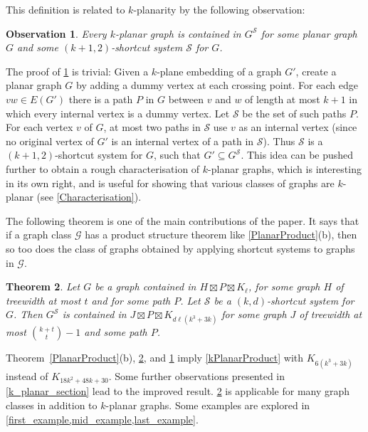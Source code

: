 \documentclass{patmorin}
\theoremstyle{plain}
\newtheorem{thm}{Theorem}
\newtheorem{obs}[thm]{Observation}
\theoremstyle{definition}
\newcommand{\note}[2]{\noindent{\color{red}[#1:~#2]}}
\newcommand{\referee}[2]{\noindent\textcolor{blue}{\framebox{\begin{minipage}{\textwidth} Ref \#{#1}: #2\end{minipage}}}}
\renewcommand{\SS}{\mathcal{S}}
\begin{document}
This definition is related to $k$-planarity by the following observation:

\begin{obs}
\label{AddDummy}
Every $k$-planar graph is contained in $G^\SS$ for some planar graph $G$ and some $(k+1,2)$-shortcut system $\SS$ for $G$.
\end{obs}

The proof of \cref{AddDummy} is trivial: Given a $k$-plane embedding of a graph $G'$, create a planar graph $G$ by adding a dummy vertex at each crossing point. For each edge $vw\in E(G')$ there is a path $P$ in $G$ between $v$ and $w$ of length at most $k+1$ in which every internal vertex is a dummy vertex. Let $\SS$ be the set of such paths $P$. For each vertex $v$ of $G$, at most two paths in $\SS$ use $v$ as an internal vertex (since no original vertex of $G'$ is an internal vertex of a path in $\SS$). Thus $\SS$ is a $(k+1,2)$-shortcut system for $G$, such that $G'\subseteq G^\SS$. This idea can be pushed further to obtain a rough characterisation of $k$-planar graphs, which is interesting in its own right, and is useful for showing that various classes of graphs are $k$-planar (see \cref{Characterisation}).


The following theorem is one of the main contributions of the paper. It says that if a graph class $\mathcal{G}$ has a product structure theorem like \cref{PlanarProduct}(b), then so too does the class of graphs obtained by applying shortcut systems to graphs in $\mathcal{G}$.

\begin{thm}
\label{ShortcutProduct}
Let $G$ be a graph contained in $H\boxtimes P \boxtimes K_\ell$, for some graph $H$ of treewidth at most $t$ and for some path $P$. Let $\SS$ be a $(k,d)$-shortcut system for $G$. Then $G^\SS$ is contained in $J\boxtimes P\boxtimes K_{d\ell(k^3+3k)}$ for some graph $J$ of treewidth at most $\binom{k+t}{t}-1$ and some path $P$.
\end{thm}



Theorem~\ref{PlanarProduct}(b), \cref{ShortcutProduct}, and \cref{AddDummy} imply \cref{kPlanarProduct} with $K_{6(k^3+3k)}$ instead of $K_{18k^2+48k+30}$. Some further observations presented in \cref{k_planar_section} lead to the improved result.  \cref{ShortcutProduct} is applicable for many graph classes in addition to $k$-planar graphs. Some examples are explored in \cref{first_example,mid_example,last_example}.
\end{document}
